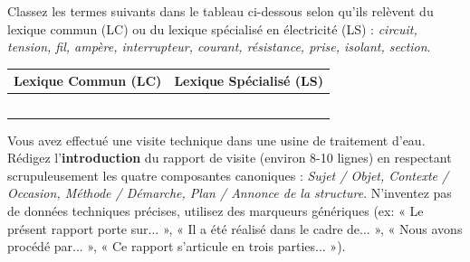 \documentclass[11pt]{article}
\begin{document}
\begin{exercice}
Classez les termes suivants dans le tableau ci-dessous selon qu'ils relèvent du lexique commun (LC) ou du lexique spécialisé en électricité (LS) : \textit{circuit, tension, fil, ampère, interrupteur, courant, résistance, prise, isolant, section}.

\begin{tabular}{|c|c|}
\hline
\textbf{Lexique Commun (LC)} & \textbf{Lexique Spécialisé (LS)} \\
\hline
\dotfill & \dotfill \\
\hline
\dotfill & \dotfill \\
\hline
\dotfill & \dotfill \\
\hline
\dotfill & \dotfill \\
\hline
\dotfill & \dotfill \\
\hline
\end{tabular}
\end{exercice}

\begin{exercice}
Vous avez effectué une visite technique dans une usine de traitement d'eau. Rédigez l'\textbf{introduction} du rapport de visite (environ 8-10 lignes) en respectant scrupuleusement les quatre composantes canoniques : \textit{Sujet / Objet, Contexte / Occasion, Méthode / Démarche, Plan / Annonce de la structure}. N'inventez pas de données techniques précises, utilisez des marqueurs génériques (ex: « Le présent rapport porte sur... », « Il a été réalisé dans le cadre de... », « Nous avons procédé par... », « Ce rapport s'articule en trois parties... »).
\end{exercice}
\end{document}
